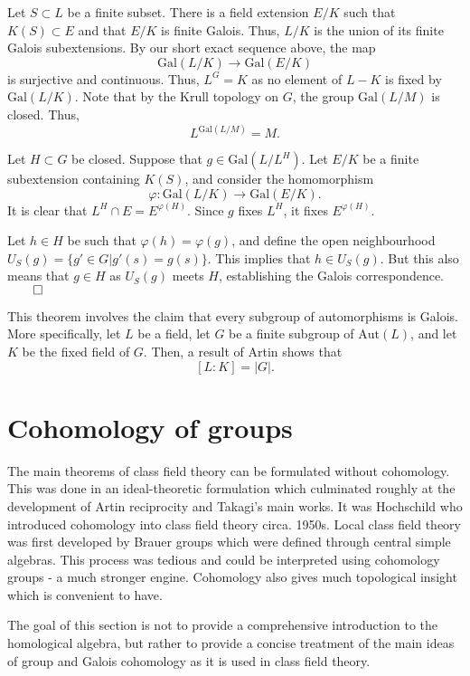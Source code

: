 \documentclass[a4paper, 12pt,oneside,openany]{book}
\begin{document}
 Let $S \subset L$ be a finite subset. There is a field extension $E/K$ such that $K(S) \subset E$ and that $E/K$ is finite Galois. Thus, $L/K$ is the union of its finite Galois subextensions. By our short exact sequence above, the map $$\text{Gal}(L/K) \to \text{Gal}(E/K)$$ is surjective and continuous. Thus, $L^G=K$ as no element of $L-K$ is fixed by $\text{Gal}(L/K)$. Note that by the Krull topology on $G$, the group $\text{Gal}(L/M)$ is closed. Thus, $$L^{\text{Gal}(L/M)} =M.$$

Let $H \subset G$ be closed. Suppose that $g \in \text{Gal}(L/L^H)$. Let $E/K$ be a finite subextension containing $K(S)$, and consider the homomorphism $$\varphi: \text{Gal}(L/K) \to \text{Gal}(E/K).$$ It is clear that $L^H \cap E = E^{\varphi(H)}$. Since $g$ fixes $L^H$, it fixes $E^{\varphi(H)}$.

Let $h \in H$ be such that $\varphi(h)=\varphi(g)$, and define the open neighbourhood $U_S(g) = \{g' \in G | g'(s) =g(s)\}$. This implies that $h \in U_S(g)$. But this also means that $g \in H$ as $U_S(g)$ meets $H$, establishing the Galois correspondence. $\qed$


This theorem involves the claim that every subgroup of automorphisms is Galois. More specifically, let $L$ be a field, let $G$ be a finite subgroup of $\text{Aut}(L)$, and let $K$ be the fixed field of $G$. Then, a result of Artin shows that $$[L:K]=|G|.$$ 

\section{Cohomology of groups}

The main theorems of class field theory can be formulated without cohomology. This was done in an ideal-theoretic formulation which culminated roughly at the development of Artin reciprocity and Takagi's main works. It was Hochschild who introduced cohomology into class field theory circa. 1950s. Local class field theory was first developed by Brauer groups which were defined through central simple algebras. This process was tedious and could be interpreted using cohomology groups - a much stronger engine. Cohomology also gives much topological insight which is convenient to have.

The goal of this section is not to provide a comprehensive introduction to the homological algebra, but rather to provide a concise treatment of the main ideas of group and Galois cohomology as it is used in class field theory.
\end{document}
